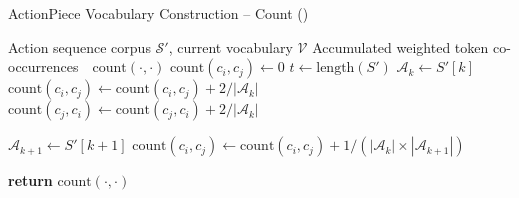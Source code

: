 \begin{algorithm}[!t]
  \caption{ActionPiece Vocabulary Construction -- Count ()}
  \label{alg:vocab_construction_count}
\begin{algorithmic}[1]
\INPUT Action sequence corpus $\mathcal{S}'$, current vocabulary $\mathcal{V}$
   \OUTPUT Accumulated weighted token co-occurrences\ \ $\text{count}(\cdot, \cdot)$
    \STATE $\text{count}(c_i, c_j) \gets 0$
   \ENDFOR
    \STATE $t \gets \text{length}(S')$ 
        \STATE $\mathcal{A}_k \gets S'[k]$ 
        \STATE {}
                \STATE $\text{count}(c_i, c_j) \gets \text{count}(c_i, c_j) + 2 / |\mathcal{A}_k|$ 
                \STATE $\text{count}(c_j, c_i) \gets \text{count}(c_j, c_i) + 2 / |\mathcal{A}_k|$ 
        \ENDFOR
        
            \STATE $\mathcal{A}_{k+1} \gets S'[k+1]$
                \STATE $\text{count}(c_i, c_j) \gets \text{count}(c_i, c_j) + 1 / (|\mathcal{A}_k| \times |\mathcal{A}_{k+1}|)$ 
            \ENDFOR
        \ENDIF
    \ENDFOR
\ENDFOR
\item[\textbf{return} $\text{count}(\cdot, \cdot)$]
\end{algorithmic}
\end{algorithm}

